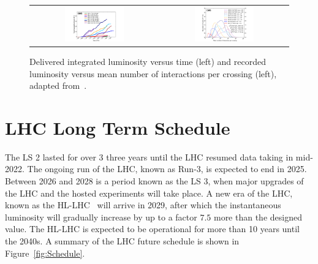 \begin{figure}[tbh!]
 \begin{center}
 \begin{tabular}{cc}
 \includegraphics[width=0.48\textwidth]{figures/Part2/LHC/twikilumi}&
 \includegraphics[width=0.48\textwidth]{figures/Part2/LHC/twikipu}\\
 \end{tabular}
 \caption{Delivered integrated luminosity versus time (left) and recorded luminosity versus mean number of interactions per crossing (left), adapted from~\cite{twiki:lumi}.}
 \label{fig:twikilumi}
 \end{center}
\end{figure} 

\section{LHC Long Term Schedule}
\label{sec:Plan}

The \ac{LS} 2 lasted for over 3 three years until the \ac{LHC} resumed data taking in mid-2022. The ongoing run of the \ac{LHC}, known as Run-3, is expected to end in 2025. Between 2026 and 2028 is a period known as the \ac{LS} 3, when major upgrades of the \ac{LHC} and the hosted experiments will take place. A new era of the \ac{LHC}, known as the \ac{HL-LHC}~\cite{Apollinari:2017lan} will arrive in 2029, after which the instantaneous luminosity will gradually increase by up to a factor $7.5$ more than the designed value. The \ac{HL-LHC} is expected to be operational for more than 10 years until the 2040s. A summary of the \ac{LHC} future schedule is shown in Figure~\ref{fig:Schedule}.

